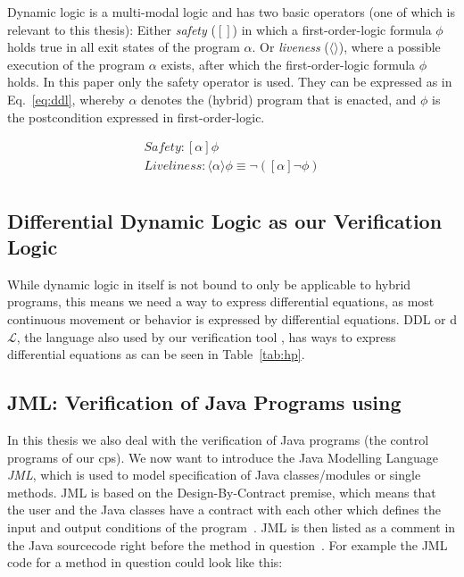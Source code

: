 Dynamic logic is a multi-modal logic and has two basic operators (one of which is relevant to this thesis): Either \textit{safety} (\([]\)) in which a first-order-logic formula \(\phi\) holds true in all exit states of the program \(\alpha\). Or \textit{liveness} (\(\langle\rangle\)), where a possible execution of the program \(\alpha\) exists, after which the first-order-logic formula \(\phi\) holds. In this paper only the safety operator is used. They can be expressed as in Eq.~\ref{eq:ddl}, whereby \(\alpha\) denotes the (hybrid) program that is enacted, and \(\phi\) is the postcondition expressed in first-order-logic.

\begin{equation}
	\begin{split}
		Safety: [\alpha]\phi \\
		Liveliness: \langle\alpha\rangle\phi \equiv \neg ([\alpha] \neg \phi) \\
	\end{split}
	\label{eq:ddl}
\end{equation}

\subsection{Differential Dynamic Logic as our Verification Logic}
\label{subsec:DDL}

While dynamic logic in itself is not bound to only be applicable to hybrid programs, this means we need a way to express differential equations, as most continuous movement or behavior is expressed by differential equations. DDL or d\(\mathcal{L}\), the language also used by our verification tool \keym, has ways to express differential equations as can be seen in Table~\ref{tab:hp}.

\subsection{JML: Verification of Java Programs using \key}
\label{subsec:jml}

In this thesis we also deal with the verification of Java programs (the control programs of our cps). We now want to introduce the Java Modelling Language \textit{JML}, which is used to model specification of Java classes/modules or single methods. JML is based on the Design-By-Contract premise, which means that the user and the Java classes have a contract with each other which defines the input and output conditions of the program~\cite{keybook2007}. JML is then listed as a comment in the Java sourcecode right before the method in question~\cite{fmcoKeYTutorial06}. For example the JML code for a method in question could look like this:


